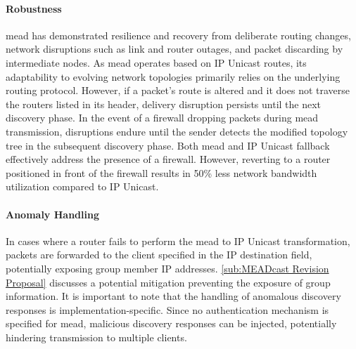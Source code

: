 \begin{itemize}
    \paragraph{Robustness}
    \gls{mead} has demonstrated resilience and recovery from deliberate routing
        changes, network disruptions such as link and router outages, and
        packet discarding by intermediate nodes.
    As \gls{mead} operates based on IP Unicast routes, its adaptability to
        evolving network topologies primarily relies on the underlying routing
        protocol.
    However, if a packet's route is altered and it does not traverse the
        routers listed in its header, delivery disruption persists until the
        next discovery phase.
        In the event of a firewall dropping packets during \gls{mead} transmission,
        disruptions endure until the sender detects the modified topology tree
        in the subsequent discovery phase.
    Both \gls{mead} and IP Unicast fallback effectively address the presence of
        a firewall.
    However, reverting to a router positioned in front of the firewall results
        in 50\% less network bandwidth utilization compared to IP Unicast.

    \paragraph{Anomaly Handling}
    In cases where a router fails to perform the \gls{mead} to IP Unicast
        transformation, packets are forwarded to the client specified in the IP
        destination field, potentially exposing group member IP addresses.
    \autoref{sub:MEADcast Revision Proposal} discusses a potential mitigation
        preventing the exposure of group information.
    It is important to note that the handling of anomalous discovery responses
        is implementation-specific.
    Since no authentication mechanism is specified for \gls{mead}, malicious
        discovery responses can be injected, potentially hindering transmission
        to multiple clients.


\end{itemize}
